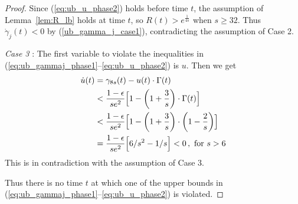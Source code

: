 \documentclass[a4paper,12pt]{article}
\begin{document}
\begin{proof}
Since (\ref{eq:ub_u_phase2}) holds before time $t$, the assumption of  Lemma~\ref{lem:R_lb} holds at time $t$, so $R(t) > e^{\frac{1}{4s}}$ when $s \geq 32$.
Thus $\dot{\gamma}_j(t) < 0$ by (\ref{ub_gamma_j_case1}), contradicting         the assumption of Case 2.

\medskip

\noindent \emph{Case 3} : The first variable to violate the inequalities in (\ref{eq:ub_gammaj_phase1}--\ref{eq:ub_u_phase2}) is $u$.
Then we get
\begin{align}
\dot{u}(t) & = \gamma_{8s}(t) - u(t) \cdot \Gamma(t) \notag \\
& < \frac{1-\epsilon}{se^{2}} \Bigl[ 1 - \left(1+\frac{3}{s}\right) \cdot \Gamma(t) \Bigr] \notag \\
& < \frac{1-\epsilon}{se^{2}} \Bigl[ 1 - \left(1+\frac{3}{s}\right)\cdot \left( 1 - \frac{2}{s} \right) \Bigr] \notag \\
& = \frac{1-\epsilon}{se^{2}} \Bigl[ 6/s^2-1/s  \Bigr] <0 \,, \mbox{ for } s > 6 \notag
\end{align}
This is in contradiction with the assumption of Case 3.

Thus there is no time $t$ at which one of the upper bounds in (\ref{eq:ub_gammaj_phase1}--\ref{eq:ub_u_phase2}) is violated.
\end{proof}
\end{document}
